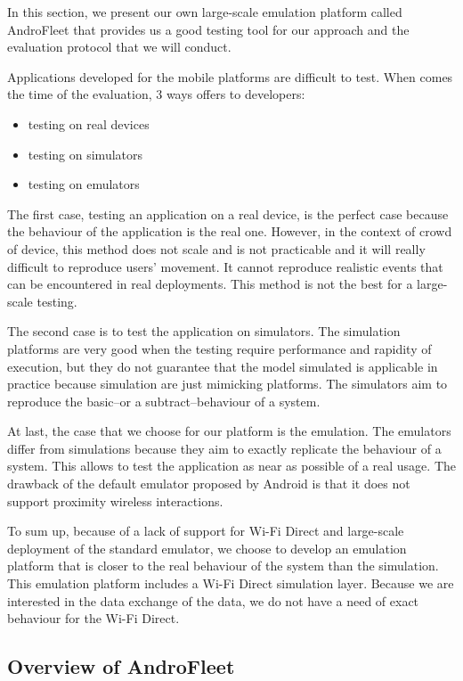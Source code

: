 

In this section, we present our own large-scale emulation platform called AndroFleet that provides us a good testing tool for our approach and the evaluation protocol that we will conduct.

Applications developed for the mobile platforms are difficult to test.
When comes the time of the evaluation, 3 ways offers to developers:
\begin{itemize}
    \item testing on real devices
    \item testing on simulators
    \item testing on emulators
\end{itemize}

The first case, testing an application on a real device, is the perfect case because the behaviour of the application is the real one.
However, in the context of crowd of device, this method does not scale and is not practicable and it will really difficult to reproduce users' movement.
It cannot reproduce realistic events that can be encountered in real deployments. 
This method is not the best for a large-scale testing.

The second case is to test the application on simulators.
The simulation platforms are very good when the testing require performance and rapidity of execution, but they do not guarantee that the model simulated is applicable in practice because simulation are just mimicking platforms.
The simulators aim to reproduce the basic--or a subtract--behaviour of a system.

At last, the case that we choose for our platform is the emulation.
The emulators differ from simulations because they aim to exactly replicate the behaviour of a system.
This allows to test the application as near as possible of a real usage.
The drawback of the default emulator proposed by Android is that it does not support proximity wireless interactions.

To sum up, because of a lack of support for Wi-Fi Direct and large-scale deployment of the standard emulator, we choose to develop an emulation platform that is closer to the real behaviour of the system than the simulation.
This emulation platform includes a Wi-Fi Direct simulation layer.
Because we are interested in the data exchange of the data, we do not have a need of exact behaviour for the Wi-Fi Direct.

\subsection{Overview of AndroFleet}

